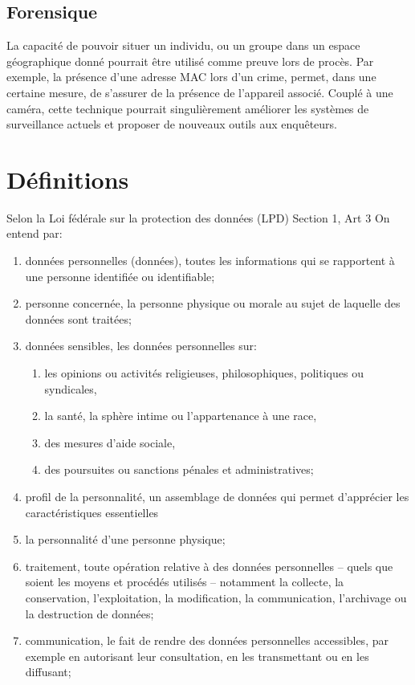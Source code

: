 \subsection{Forensique}
La capacité de pouvoir situer un individu, ou un groupe dans un espace géographique donné pourrait être utilisé
comme preuve lors de procès. Par exemple, la présence d’une adresse MAC lors d’un crime, permet, dans une certaine mesure, 
de s’assurer de la présence de l’appareil associé. Couplé à une caméra, cette technique pourrait
singulièrement améliorer les systèmes de surveillance actuels et proposer de nouveaux outils aux enquêteurs.

\section{Définitions}
Selon la Loi fédérale sur la protection des données (LPD) Section 1, Art 3
On entend par:

\begin{enumerate}[label=\alph*]
\item données personnelles (données), toutes les informations qui se rapportent à une personne identifiée ou
identifiable;
\item personne concernée, la personne physique ou morale au sujet de laquelle des données sont traitées;
\item données sensibles, les données personnelles sur:
\begin{enumerate}[label=\alph*]
\item les opinions ou activités religieuses, philosophiques, politiques ou syndicales,
\item la santé, la sphère intime ou l’appartenance à une race,
\item des mesures d’aide sociale,
\item des poursuites ou sanctions pénales et administratives;
\end{enumerate}
\item profil de la personnalité, un assemblage de données qui permet d’apprécier les caractéristiques essentielles
\item la personnalité d’une personne physique;
\item traitement, toute opération relative à des données personnelles – quels que soient les moyens et procédés
utilisés – notamment la collecte, la conservation, l’exploitation, la modification, la communication,
l’archivage ou la destruction de données;
\item communication, le fait de rendre des données personnelles accessibles, par exemple en autorisant leur
consultation, en les transmettant ou en les diffusant;
\end{enumerate}

